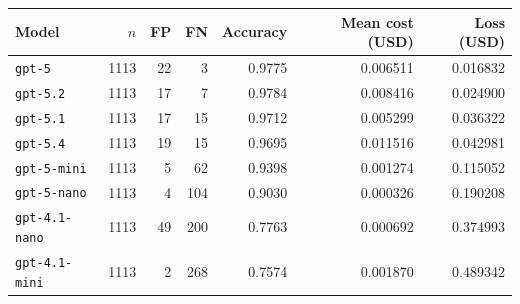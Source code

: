 \begin{tabular}{lrrrrrr}
    \toprule
    Model & $n$ & FP & FN & Accuracy & Mean cost (USD) & Loss (USD) \\
    \midrule
    \texttt{gpt-5} & 1113 & 22 & 3 & 0.9775 & 0.006511 & 0.016832 \\
    \texttt{gpt-5.2} & 1113 & 17 & 7 & 0.9784 & 0.008416 & 0.024900 \\
    \texttt{gpt-5.1} & 1113 & 17 & 15 & 0.9712 & 0.005299 & 0.036322 \\
    \texttt{gpt-5.4} & 1113 & 19 & 15 & 0.9695 & 0.011516 & 0.042981 \\
    \texttt{gpt-5-mini} & 1113 & 5 & 62 & 0.9398 & 0.001274 & 0.115052 \\
    \texttt{gpt-5-nano} & 1113 & 4 & 104 & 0.9030 & 0.000326 & 0.190208 \\
    \texttt{gpt-4.1-nano} & 1113 & 49 & 200 & 0.7763 & 0.000692 & 0.374993 \\
    \texttt{gpt-4.1-mini} & 1113 & 2 & 268 & 0.7574 & 0.001870 & 0.489342 \\
    \bottomrule
\end{tabular}
